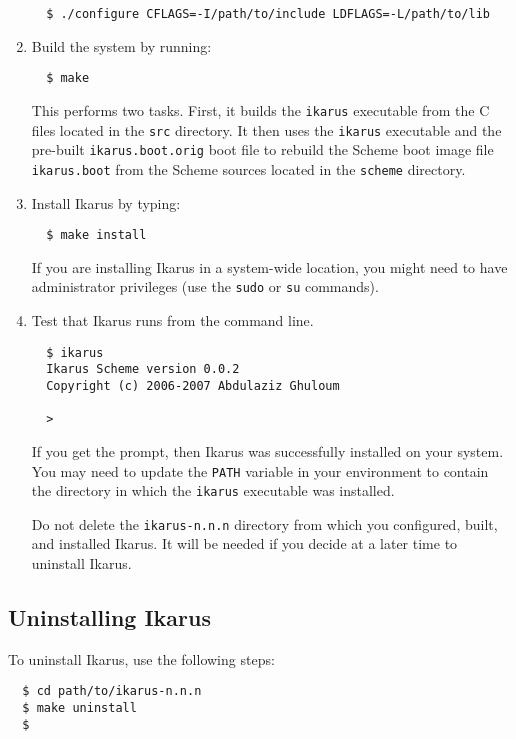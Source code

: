 \documentclass[onecolumn, 12pt, twoside, openright, dvipdfm]{book}
\begin{document}
\begin{enumerate}
\begin{verbatim}
  $ ./configure CFLAGS=-I/path/to/include LDFLAGS=-L/path/to/lib
\end{verbatim}

\item Build the system by running:
\begin{verbatim}
  $ make
\end{verbatim}
This performs two
tasks.  First, it builds the \texttt{ikarus} executable from the C
files located in the \texttt{src} directory.  It then uses the
\texttt{ikarus} executable and the pre-built
\texttt{ikarus.boot.orig} boot file to rebuild the Scheme boot image
file \texttt{ikarus.boot} from the Scheme sources located in the
\texttt{scheme} directory.

\item Install Ikarus by typing:
\begin{verbatim}
  $ make install
\end{verbatim}
If you are installing Ikarus in a system-wide location, you might
need to have administrator privileges (use the \texttt{sudo} or
\texttt{su} commands).

\item Test that Ikarus runs from the command line.
\begin{verbatim}
  $ ikarus
  Ikarus Scheme version 0.0.2
  Copyright (c) 2006-2007 Abdulaziz Ghuloum

  > 
\end{verbatim}
If you get the prompt, then Ikarus was successfully installed on
your system.  You may need to update the \texttt{PATH} variable in
your environment to contain the directory in which the
\texttt{ikarus} executable was installed.

Do not delete the \texttt{ikarus-n.n.n} directory from which you
configured, built, and installed Ikarus.  It will be needed if you
decide at a later time to uninstall Ikarus.

\end{enumerate}

\subsection{Uninstalling Ikarus}

To uninstall Ikarus, use the following steps:

\begin{verbatim}
  $ cd path/to/ikarus-n.n.n
  $ make uninstall
  $
\end{verbatim}
\end{document}
